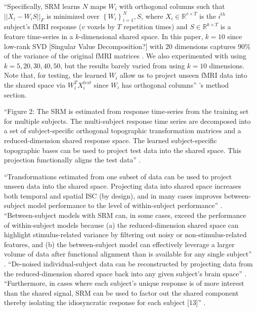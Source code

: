 ``Specifically, SRM learns $N$ maps $W_{i}$ with orthogonal columns such that
$||X_{i}-W_{i}S||_{F}$ is minimized over $\left\{ W_{i}\right\} _{i=1}^{N},S$,
where $X_{i}\in\mathbb{R}^{v\times{T}}$ is the $i^{th}$ subject's fMRI response
($v$ voxels by $T$ repetition times) and $S\in\mathbb{R}^{k\times{T}}$ is a
feature time-series in a $k$-dimensional shared space. In this paper, $k=10$
since low-rank SVD [Singular Value Decomposition?] with 20 dimensions captures
90\% of the variance of the original fMRI matrices \citep{chen2015reduced}. We
also experimented with using $k=5,20,30,40,50$, but the results barely varied
from using $k=10$ dimensions.  Note that, for testing, the learned $W_{i}$ allow
us to project unseen fMRI data into the shared space via $W_{i}^{T}X_{i}^{test}$
since $W_{i}$ has orthogonal columns'' \citep{vodrahalli2018mapping}'s method
section.

%
``Figure 2: The SRM is estimated from response time-series from the training set
for multiple subjects. The multi-subject response time series are decomposed
into a set of subject-specific orthogonal topographic transformation matrices
and a reduced-dimension shared response space. The learned subject-specific
topographic bases can be used to project test data into the shared space. This
projection functionally aligns the test data'' \citep{kumar2020brainiak}.

%
``Transformations estimated from one subset of data can be used to project
unseen data into the shared space. Projecting data into shared space increases
both temporal and spatial ISC (by design), and in many cases improves
between-subject model performance to the level of within-subject performance''
\citep{kumar2020brainiak}.
%
``Between-subject models with SRM can, in some cases, exceed the performance of
within-subject models because (a) the reduced-dimension shared space can
highlight stimulus-related variance by filtering out noisy or
non-stimulus-related features, and (b) the between-subject model can effectively
leverage a larger volume of data after functional alignment than is available
for any single subject'' \citep{kumar2020brainiak}.
%
``De-noised individual-subject data can be reconstructed by projecting data from
the reduced-dimension shared space back into any given subject’s brain space''
\citep{kumar2020brainiak}.
%
``Furthermore, in cases where each subject's unique response is of more interest
than the shared signal, SRM can be used to factor out the shared component
thereby isolating the idiosyncratic response for each subject [13]''
\citep{kumar2020brainiak}.

